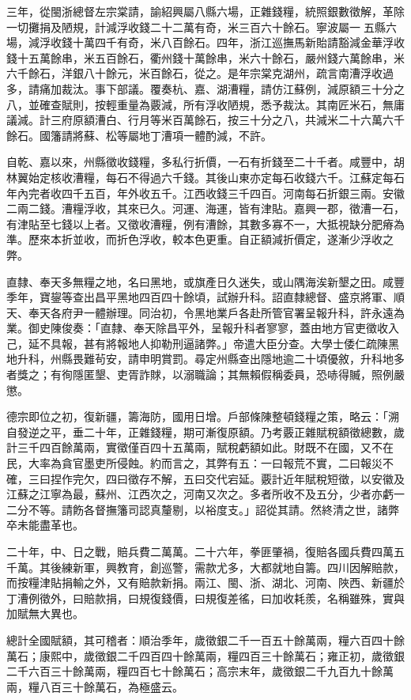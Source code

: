 \begin{pinyinscope}
三年，從閩浙總督左宗棠請，諭紹興屬八縣六場，正雜錢糧，統照銀數徵解，革除一切攤捐及陋規，計減浮收錢二十二萬有奇，米三百六十餘石。寧波屬一五縣六場，減浮收錢十萬四千有奇，米八百餘石。四年，浙江巡撫馬新貽請豁減金華浮收錢十五萬餘串，米五百餘石，衢州錢十萬餘串，米六十餘石，嚴州錢六萬餘串，米六千餘石，洋銀八十餘元，米百餘石，從之。是年宗棠克湖州，疏言南漕浮收過多，請痛加裁汰。事下部議。覆奏杭、嘉、湖漕糧，請仿江蘇例，減原額三十分之八，並確查賦則，按輕重量為覈減，所有浮收陋規，悉予裁汰。其南匠米石，無庸議減。計三府原額漕白、行月等米百萬餘石，按三十分之八，共減米二十六萬六千餘石。國籓請將蘇、松等屬地丁漕項一體酌減，不許。

自乾、嘉以來，州縣徵收錢糧，多私行折價，一石有折錢至二十千者。咸豐中，胡林翼始定核收漕糧，每石不得過六千錢。其後山東亦定每石收錢六千。江蘇定每石年內完者收四千五百，年外收五千。江西收錢三千四百。河南每石折銀三兩。安徽二兩二錢。漕糧浮收，其來已久。河運、海運，皆有津貼。嘉興一郡，徵漕一石，有津貼至七錢以上者。又徵收漕糧，例有漕餘，其數多寡不一，大抵視缺分肥瘠為準。歷來本折並收，而折色浮收，較本色更重。自正額減折價定，遂漸少浮收之弊。

直隸、奉天多無糧之地，名曰黑地，或旗產日久迷失，或山隅海涘新墾之田。咸豐季年，寶鋆等查出昌平黑地四百四十餘頃，試辦升科。詔直隸總督、盛京將軍、順天、奉天各府尹一體辦理。同治初，令黑地業戶各赴所管官署呈報升科，許永遠為業。御史陳俊奏：「直隸、奉天除昌平外，呈報升科者寥寥，蓋由地方官吏徵收入己，延不具報，甚有將報地人抑勒刑逼諸弊。」帝遣大臣分查。大學士倭仁疏陳黑地升科，州縣畏難茍安，請申明賞罰。尋定州縣查出隱地逾二十頃優敘，升科地多者獎之；有徇隱匿墾、吏胥詐賕，以溺職論；其無賴假稱委員，恐哧得贓，照例嚴懲。

德宗即位之初，復新疆，籌海防，國用日增。戶部條陳整頓錢糧之策，略云：「溯自發逆之平，垂二十年，正雜錢糧，期可漸復原額。乃考覈正雜賦稅額徵總數，歲計三千四百餘萬兩，實徵僅百四十五萬兩，賦稅虧額如此。財既不在國，又不在民，大率為貪官墨吏所侵蝕。約而言之，其弊有五：一曰報荒不實，二曰報災不確，三曰捏作完欠，四曰徵存不解，五曰交代宕延。覈計近年賦稅短徵，以安徽及江蘇之江寧為最，蘇州、江西次之，河南又次之。多者所收不及五分，少者亦虧一二分不等。請飭各督撫籓司認真釐剔，以裕度支。」詔從其請。然終清之世，諸弊卒未能盡革也。

二十年，中、日之戰，賠兵費二萬萬。二十六年，拳匪肇禍，復賠各國兵費四萬五千萬。其後練新軍，興教育，創巡警，需款尤多，大都就地自籌。四川因解賠款，而按糧津貼捐輸之外，又有賠款新捐。兩江、閩、浙、湖北、河南、陜西、新疆於丁漕例徵外，曰賠款捐，曰規復錢價，曰規復差徭，曰加收耗羨，名稱雖殊，實與加賦無大異也。

總計全國賦額，其可稽者：順治季年，歲徵銀二千一百五十餘萬兩，糧六百四十餘萬石；康熙中，歲徵銀二千四百四十餘萬兩，糧四百三十餘萬石；雍正初，歲徵銀二千六百三十餘萬兩，糧四百七十餘萬石；高宗末年，歲徵銀二千九百九十餘萬兩，糧八百三十餘萬石，為極盛云。


\end{pinyinscope}
